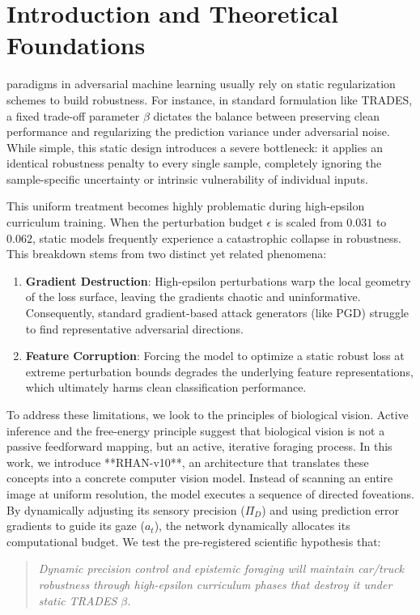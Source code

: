 \section{Introduction and Theoretical Foundations}
 paradigms in adversarial machine learning usually rely on static regularization schemes to build robustness. For instance, in standard formulation like TRADES, a fixed trade-off parameter $\beta$ dictates the balance between preserving clean performance and regularizing the prediction variance under adversarial noise. While simple, this static design introduces a severe bottleneck: it applies an identical robustness penalty to every single sample, completely ignoring the sample-specific uncertainty or intrinsic vulnerability of individual inputs.

This uniform treatment becomes highly problematic during high-epsilon curriculum training. When the perturbation budget $\epsilon$ is scaled from $0.031$ to $0.062$, static models frequently experience a catastrophic collapse in robustness. This breakdown stems from two distinct yet related phenomena:
\begin{enumerate}
    \item \textbf{Gradient Destruction}: High-epsilon perturbations warp the local geometry of the loss surface, leaving the gradients chaotic and uninformative. Consequently, standard gradient-based attack generators (like PGD) struggle to find representative adversarial directions.
    \item \textbf{Feature Corruption}: Forcing the model to optimize a static robust loss at extreme perturbation bounds degrades the underlying feature representations, which ultimately harms clean classification performance.
\end{enumerate}

To address these limitations, we look to the principles of biological vision. Active inference and the free-energy principle suggest that biological vision is not a passive feedforward mapping, but an active, iterative foraging process. In this work, we introduce **RHAN-v10**, an architecture that translates these concepts into a concrete computer vision model. Instead of scanning an entire image at uniform resolution, the model executes a sequence of directed foveations. By dynamically adjusting its sensory precision ($\Pi_D$) and using prediction error gradients to guide its gaze ($a_t$), the network dynamically allocates its computational budget. We test the pre-registered scientific hypothesis that:
\begin{quote}
\textit{Dynamic precision control and epistemic foraging will maintain car/truck robustness through high-epsilon curriculum phases that destroy it under static TRADES $\beta$.}
\end{quote}

